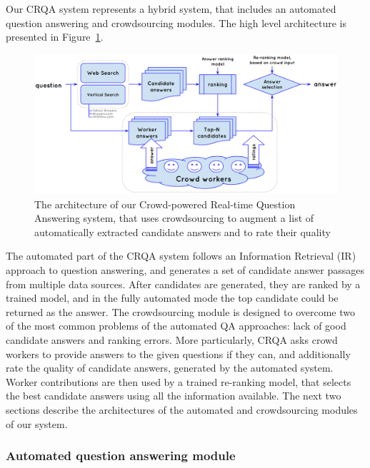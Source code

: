 Our CRQA system represents a hybrid system, that includes an automated question answering and crowdsourcing modules.
The high level architecture is presented in Figure~\ref{figure:crowdsourcing:system}.

\begin{figure}[h!t]
	\centering
	\includegraphics[width=\textwidth]{img/crqa_system}
	\caption{The architecture of our Crowd-powered Real-time Question Answering system, that uses crowdsourcing to augment a list of automatically extracted candidate answers and to rate their quality}
	\label{figure:crowdsourcing:system}
\end{figure}

The automated part of the CRQA system follows an Information Retrieval (IR) approach to question answering, and generates a set of candidate answer passages from multiple data sources.
After candidates are generated, they are ranked by a trained model, and in the fully automated mode the top candidate could be returned as the answer.
The crowdsourcing module is designed to overcome two of the most common problems of the automated QA approaches: lack of good candidate answers and ranking errors.
More particularly, CRQA asks crowd workers to provide answers to the given questions if they can, and additionally rate the quality of candidate answers, generated by the automated system.
Worker contributions are then used by a trained re-ranking model, that selects the best candidate answers using all the information available.
The next two sections describe the architectures of the automated and crowdsourcing modules of our system.

\subsubsection{Automated question answering module}
\label{section:crowdsourcing:approach:crqa:auto}


